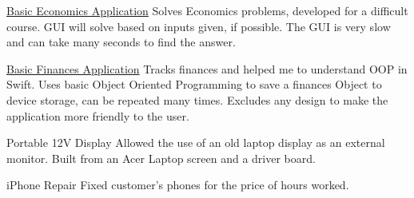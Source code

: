 \documentclass[10pt,letterpaper]{article}
\newenvironment{indentsection}[1]%
{\begin{list}{}%
	{\setlength{\leftmargin}{#1}}%
	\item[]%
}
{\end{list}}
\begin{document}
\begin{indentsection}{\parindent}
\begin{description*}
	\item[\href{https://github.com/jeremyggiese/jgieseRepo/tree/master/Economics}{Basic Economics Application}]
	Solves Economics problems, developed for a difficult course. GUI will solve based on inputs given, if possible. The GUI is very slow and can take many seconds to find the answer.
	\item[\href{https://github.com/jeremyggiese/jgieseRepo/tree/master/iOS/Finances}{Basic Finances Application}]
	Tracks finances and helped me to understand OOP in Swift. Uses basic Object Oriented Programming to save a finances Object to device storage, can be repeated many times. Excludes any design to make the application more friendly to the user.
	\item[Portable 12V Display]
	Allowed the use of an old laptop display as an external monitor. Built from an Acer Laptop screen and a driver board.
	\item[iPhone Repair]
	Fixed customer's phones for the price of hours worked.
	
\end{description*}
\end{indentsection}

%
\end{document}
